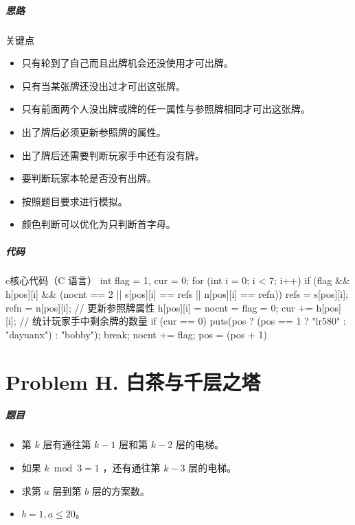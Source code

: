 \documentclass[
     aspectratio=169,                   %
]{beamer}
\begin{document}
\begin{frame}
	\frametitle{思路}
	 
	\begin{exampleblock}{关键点}
		\begin{itemize}
			\item 只有轮到了自己而且出牌机会还没使用才可出牌。
			\item 只有当某张牌还没出过才可出这张牌。
			\item 只有前面两个人没出牌或牌的任一属性与参照牌相同才可出这张牌。
			\item 出了牌后必须更新参照牌的属性。
			\item 出了牌后还需要判断玩家手中还有没有牌。
			\item 要判断玩家本轮是否没有出牌。
		\end{itemize}
	\end{exampleblock}
	\begin{itemize}
		\item 按照题目要求进行模拟。
		\item 颜色判断可以优化为只判断首字母。
	\end{itemize}
	
\end{frame}

\begin{frame}[fragile]
	\frametitle{代码}
	 \begin{codeblock}{c}{核心代码（C 语言）}
int flag = 1, cur = 0;
for (int i = 0; i < 7; i++) {
    if (flag && h[pos][i] && (nocnt == 2 || s[pos][i] == refs || n[pos][i] == refn)) {
        refs = s[pos][i]; refn = n[pos][i]; // 更新参照牌属性
        h[pos][i] = nocnt = flag = 0;
    }
    cur += h[pos][i]; // 统计玩家手中剩余牌的数量
}
if (cur == 0) {
    puts(pos ? (pos == 1 ? "lr580" : "dayuanx") : "bobby"); break;
}
nocnt += flag; pos = (pos + 1) %
\end{codeblock}
\end{frame}


\part{Problem H. 白茶与千层之塔}
\begin{frame}
	\frametitle{题目}
	\begin{itemize}
		\item 第 $k$ 层有通往第 $k-1$ 层和第 $k-2$ 层的电梯。
		\item 如果 $k \bmod 3 = 1$ ，还有通往第 $k-3$ 层的电梯。
		\item 求第 $a$ 层到第 $b$ 层的方案数。
		\item $b=1, a\le 20$。
	\end{itemize}
\end{frame}
\end{document}
